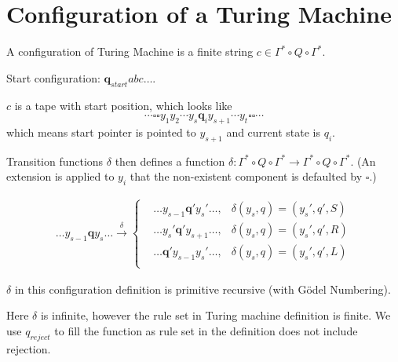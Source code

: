 \section{Configuration of a Turing Machine}

\begin{definition}[Configuration] A configuration of Turing Machine is a finite string
\(c \in \Gamma^*\circ Q\circ \Gamma^*\).
\end{definition}


Start configuration: \(\mathbf{q}_{start}abc\dots\).

\(c\) is a tape with start position, which looks like
$$\cdots \square \square y_1 y_2 \cdots y_s \mathbf{q}_i y_{s+1} \cdots y_t \square \square \cdots$$
which means start pointer is pointed to \(y_{s+1}\) and current state is $q_i$.

Transition functions \(\delta\) then defines a function $\delta: \Gamma^* \circ Q \circ \Gamma^* \rightarrow \Gamma^* \circ Q \circ \Gamma^*$. (An extension is applied to \(y_i\) that the
non-existent component is defaulted by \(\square\).)

\begin{align*}
\dots y_{s-1}\mathbf{q} y_s\dots \overset{\delta}{\rightarrow} \left\{\begin{aligned}
&\dots y_{s-1}\mathbf{q'} y_s' \dots, & \delta(y_s, q) = (y_s', q', S)\\
&\dots y_{s}'\mathbf{q'} y_{s+1} \dots, & \delta(y_s, q) = (y_s', q', R)\\
&\dots \mathbf{q'} y_{s-1} y_{s}' \dots, & \delta(y_s, q) = (y_s', q', L)\\
\end{aligned}\right.
\end{align*}

\begin{observation}
\(\delta\) in this configuration definition is primitive recursive (with G\"{o}del Numbering).
\end{observation}

\begin{remark}
Here $\delta$ is infinite, however the rule set in Turing machine definition is finite. We use $q_{reject}$ to fill the function as rule set in the definition does not include rejection.
\end{remark}
